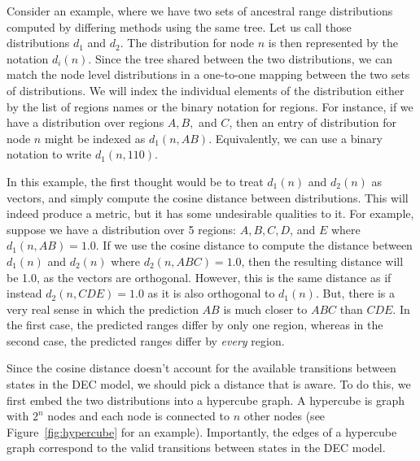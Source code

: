 \documentclass{article}
\begin{document}
Consider an example, where we have two sets of ancestral range distributions computed by differing methods using the
same tree. Let us call those distributions $d_1$ and $d_2$. The distribution for node $n$ is then represented by the
notation $d_i(n)$. Since the tree shared between the two distributions, we can match the node level distributions in a
one-to-one mapping between the two sets of distributions. We will index the individual elements of the distribution
either by the list of regions names or the binary notation for regions. For instance, if we have a distribution over
regions $A, B,$ and $C$, then an entry of distribution for node $n$ might be indexed as $d_1(n, AB)$. Equivalently, we
can use a binary notation to write $d_1(n, 110)$.

In this example, the first thought would be to treat $d_1(n)$ and $d_2(n)$ as vectors, and simply compute the cosine
distance between distributions. This will indeed produce a metric, but it has some undesirable qualities to it. For
example, suppose we have a distribution over 5 regions: $A, B, C, D$, and $E$ where $d_1(n, AB) = 1.0$. If we use the
cosine distance to compute the distance between $d_1(n)$ and $d_2(n)$ where $d_2(n, ABC) = 1.0$, then the resulting
distance will be 1.0, as the vectors are orthogonal. However, this is the same distance as if instead $d_2(n, CDE) =
  1.0$ as it is also orthogonal to $d_1(n)$. But, there is a very real sense in which the prediction $AB$ is much closer
to $ABC$ than $CDE$. In the first case, the predicted ranges differ by only one region, whereas in the second case, the
predicted ranges differ by \textit{every} region.

Since the cosine distance doesn't account for the available transitions between states in the DEC model, we should pick
a distance that is aware. To do this, we first embed the two distributions into a hypercube graph. A hypercube is graph
with $2^n$ nodes and each node is connected to $n$ other nodes (see Figure~\ref{fig:hypercube} for an example).
Importantly, the edges of a hypercube graph correspond to the valid transitions between states in the DEC
model\footnotemark.

\end{document}
